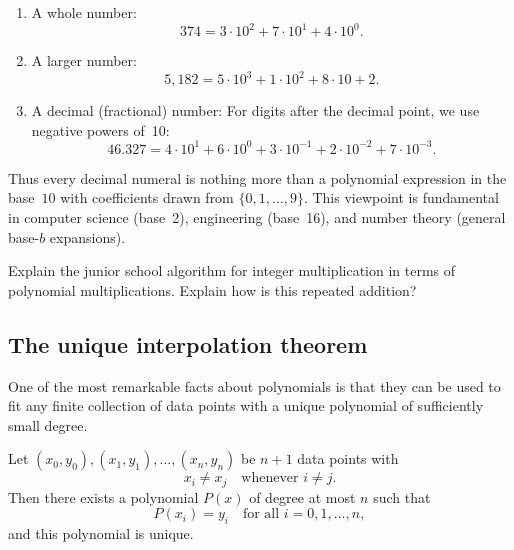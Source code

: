 \begin{example}
\begin{enumerate}
\item A whole number:
\[
374 = 3\cdot 10^2 + 7\cdot 10^1 + 4\cdot 10^0.
\]
\item A larger number:
\[
5{,}182
= 5\cdot 10^3 + 1\cdot 10^2 + 8\cdot 10 + 2.
\]
\item A decimal (fractional) number:
For digits after the decimal point, we use negative powers of~10:
\[
46.327
= 4\cdot 10^1
+ 6\cdot 10^0
+ 3\cdot 10^{-1}
+ 2\cdot 10^{-2}
+ 7\cdot 10^{-3}.
\]
\end{enumerate}
\end{example}
\medskip

Thus every decimal numeral is nothing more than a polynomial expression
in the base~$10$ with coefficients drawn from $\{0,1,\dots,9\}$.
This viewpoint is fundamental in computer science (base~2),
engineering (base~16), and number theory (general base-$b$ expansions).

\begin{exercise}
Explain the junior school algorithm for integer multiplication in terms of polynomial multiplications. Explain how is this repeated addition?
\end{exercise}

\subsection{The unique interpolation theorem}

One of the most remarkable facts about polynomials is that they can be
used to fit any finite collection of data points with a unique polynomial
of sufficiently small degree.

\begin{theorem}
Let $(x_0,y_0), (x_1,y_1), \dots, (x_n,y_n)$ be $n\!+\!1$ data points with
\[
x_i \neq x_j \quad \text{whenever } i\neq j.
\]
Then there exists a polynomial $P(x)$ of degree at most $n$ such that
\[
P(x_i)=y_i \quad \text{for all } i=0,1,\dots,n,
\]
and this polynomial is unique.
\end{theorem}


